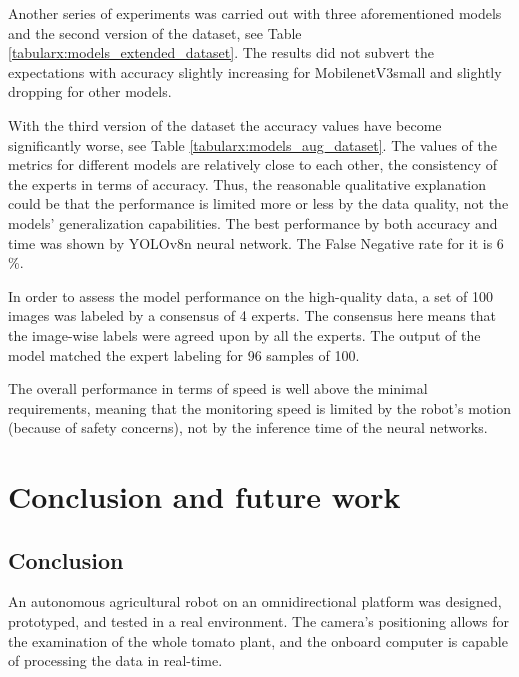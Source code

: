 \begin{description}
Another series of experiments was carried out with three aforementioned models and the second version of the dataset, see Table \ref{tabularx:models_extended_dataset}.
The results did not subvert the expectations with accuracy slightly increasing for MobilenetV3small and slightly dropping for other models.

With the third version of the dataset the accuracy values have become significantly worse, see Table \ref{tabularx:models_aug_dataset}.
The values of the metrics for different models are relatively close to each other,  the consistency of the experts in terms of accuracy.
Thus, the reasonable qualitative explanation could be that the performance is limited more or less by the data quality, not the models' generalization capabilities.
The best performance by both accuracy and time was shown by YOLOv8n neural network.
The False Negative rate for it is 6 \%.

In order to assess the model performance on the high-quality data, a set of 100 images was labeled by a consensus of 4 experts.
The consensus here means that the image-wise labels were agreed upon by all the experts.
The output of the model matched the expert labeling for 96 samples of 100.

The overall performance in terms of speed is well above the minimal requirements, meaning that the monitoring speed is limited by the robot's motion (because of safety concerns), not by the inference time of the neural networks.


\section{Conclusion and future work}

\subsection{Conclusion}

An autonomous agricultural robot on an omnidirectional platform was designed, prototyped, and tested in a real environment.
The camera's positioning allows for the examination of the whole tomato plant, and the onboard computer is capable of processing the data in real-time.


\end{description}
